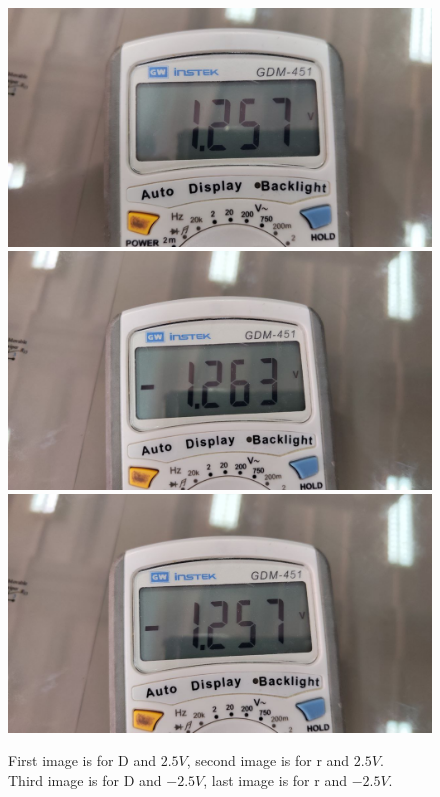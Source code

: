 \documentclass[11pt]{article}
\begin{document}
\begin{question}
\begin{subquestion}
{\begin{figure}[H]
                \includegraphics[scale=0.08,angle=0]{Fig/21.jpeg}
                \includegraphics[scale=0.08,angle=0]{Fig/22.jpeg}
                \includegraphics[scale=0.08,angle=0]{Fig/23.jpeg}
                \caption{First image is for D and $2.5V$, second image is for r and $2.5V$. \\
                    \hspace*{14mm} Third image is for D and $-2.5V$, last image is for r and $-2.5V$.}
            \end{figure}

}
\end{subquestion}
\end{question}
\end{document}

